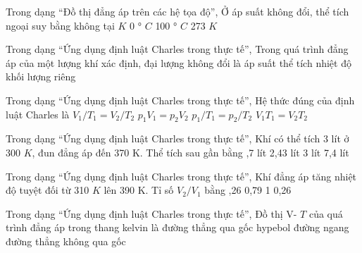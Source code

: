\begin{ex}
Trong dạng “Đồ thị đẳng áp trên các hệ tọa độ”, Ở áp suất không đổi, thể tích ngoại suy bằng không tại
\choice
{ $K$}
{0 ° $C$}
{100 ° $C$}
{273 $K$}
\end{ex}

\begin{ex}
Trong dạng “Ứng dụng định luật Charles trong thực tế”, Trong quá trình đẳng áp của một lượng khí xác định, đại lượng không đổi là
\choice
{\True áp suất}
{thể tích}
{nhiệt độ}
{khối lượng riêng}
\end{ex}

\begin{ex}
Trong dạng “Ứng dụng định luật Charles trong thực tế”, Hệ thức đúng của định luật Charles là
\choice
{\True $V_1/T_1=V_2/T_2$}
{$p_1V_1=p_2V_2$}
{$p_1/T_1=p_2/T_2$}
{$V_1T_1=V_2T_2$}
\end{ex}

\begin{ex}
Trong dạng “Ứng dụng định luật Charles trong thực tế”, Khí có thể tích 3 lít ở 300 $K$, đun đẳng áp đến 370 K. Thể tích sau gần bằng
\choice
{,7 lít}
{2,43 lít}
{3 lít}
{7,4 lít}
\end{ex}

\begin{ex}
Trong dạng “Ứng dụng định luật Charles trong thực tế”, Khí đẳng áp tăng nhiệt độ tuyệt đối từ 310 $K$ lên 390 K. Tỉ số $V_2/V_1$ bằng
\choice
{,26}
{0,79}
{1}
{0,26}
\end{ex}

\begin{ex}
Trong dạng “Ứng dụng định luật Charles trong thực tế”, Đồ thị V- $T$ của quá trình đẳng áp trong thang kelvin là
\choice
{\True đường thẳng qua gốc}
{hypebol}
{đường ngang}
{đường thẳng không qua gốc}
\end{ex}

